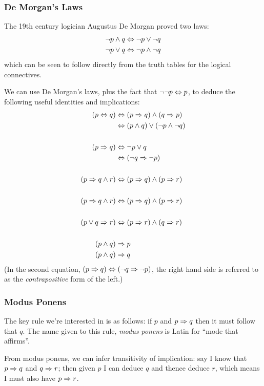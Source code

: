 \subsubsection{De Morgan's Laws}

The 19th century logician Augustus De Morgan proved two laws:
\begin{align*}
\neg{}p \wedge q
& \Leftrightarrow \neg{}p \vee \neg{}q \\
\neg{}p \vee q
& \Leftrightarrow \neg{}p \wedge \neg{}q
\end{align*}
which can be seen to follow directly from the truth tables for the
logical connectives.

We can use De Morgan's laws, plus the fact that $\neg{}\neg{}p \Leftrightarrow p$,
to deduce the following useful identities and implications:
\begin{align*}
(p \Leftrightarrow q)
& \Leftrightarrow (p \Rightarrow q) \wedge (q \Rightarrow p) \\
& \Leftrightarrow (p \wedge q) \vee (\neg{}p \wedge \neg{}q) \\
\\
(p \Rightarrow q)
& \Leftrightarrow \neg{}p \vee q \\
& \Leftrightarrow (\neg{}q \Rightarrow \neg{}p) \\
\\
(p \Rightarrow q \wedge r)
& \Leftrightarrow (p \Rightarrow q) \wedge (p \Rightarrow r) \\
\\
(p \Rightarrow q \wedge r)
& \Leftrightarrow (p \Rightarrow q) \wedge (p \Rightarrow r) \\
\\
(p \vee q \Rightarrow r)
& \Leftrightarrow (p \Rightarrow r) \wedge (q \Rightarrow r) \\
\\
(p \wedge q)
& \Rightarrow p \\
(p \wedge q)
& \Rightarrow q \\
\end{align*}
(In the second equation, $(p \Rightarrow q) \Leftrightarrow (\neg{}q \Rightarrow \neg{}p)$, the
right hand side is referred to as the \emph{contrapositive} form of the
left.)

\subsubsection{Modus Ponens}

The key rule we're interested in is as follows: if $p$ and $p \Rightarrow q$
then it must follow that $q$.  The name given to this rule, \emph{modus
ponens} is Latin for ``mode that affirms''.

From modus ponens, we can infer transitivity of implication: say I know
that $p \Rightarrow q$ and $q \Rightarrow r$; then given $p$ I can deduce $q$ and
thence deduce $r$, which means I must also have $p \Rightarrow r$.

